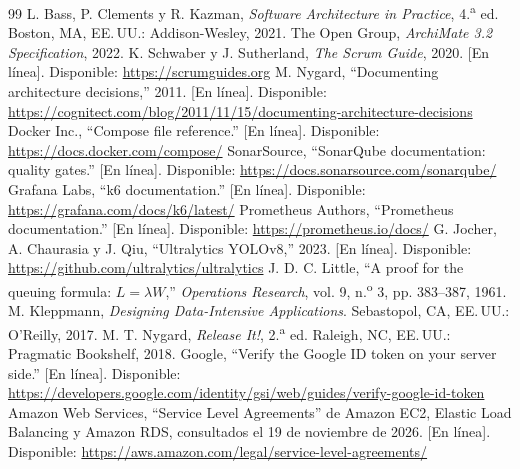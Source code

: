 \documentclass[conference]{IEEEtran}
\begin{document}
\begin{thebibliography}{99}
 L. Bass, P. Clements y R. Kazman, \emph{Software Architecture in Practice}, 4.\textsuperscript{a} ed. Boston, MA, EE.\,UU.: Addison-Wesley, 2021.
 The Open Group, \emph{ArchiMate 3.2 Specification}, 2022.
 K. Schwaber y J. Sutherland, \emph{The Scrum Guide}, 2020. [En línea]. Disponible: \url{https://scrumguides.org}
 M. Nygard, ``Documenting architecture decisions,'' 2011. [En línea]. Disponible: \url{https://cognitect.com/blog/2011/11/15/documenting-architecture-decisions}
 Docker Inc., ``Compose file reference.'' [En línea]. Disponible: \url{https://docs.docker.com/compose/}
 SonarSource, ``SonarQube documentation: quality gates.'' [En línea]. Disponible: \url{https://docs.sonarsource.com/sonarqube/}
 Grafana Labs, ``k6 documentation.'' [En línea]. Disponible: \url{https://grafana.com/docs/k6/latest/}
 Prometheus Authors, ``Prometheus documentation.'' [En línea]. Disponible: \url{https://prometheus.io/docs/}
 G. Jocher, A. Chaurasia y J. Qiu, ``Ultralytics YOLOv8,'' 2023. [En línea]. Disponible: \url{https://github.com/ultralytics/ultralytics}
 J. D. C. Little, ``A proof for the queuing formula: $L=\lambda W$,'' \emph{Operations Research}, vol. 9, n.\textsuperscript{o} 3, pp. 383--387, 1961.
 M. Kleppmann, \emph{Designing Data-Intensive Applications}. Sebastopol, CA, EE.\,UU.: O'Reilly, 2017.
 M. T. Nygard, \emph{Release It!}, 2.\textsuperscript{a} ed. Raleigh, NC, EE.\,UU.: Pragmatic Bookshelf, 2018.
 Google, ``Verify the Google ID token on your server side.'' [En línea]. Disponible: \url{https://developers.google.com/identity/gsi/web/guides/verify-google-id-token}
 Amazon Web Services, ``Service Level Agreements'' de Amazon EC2, Elastic Load Balancing y Amazon RDS, consultados el 19 de noviembre de 2026. [En línea]. Disponible: \url{https://aws.amazon.com/legal/service-level-agreements/}
\end{thebibliography}
\end{document}
